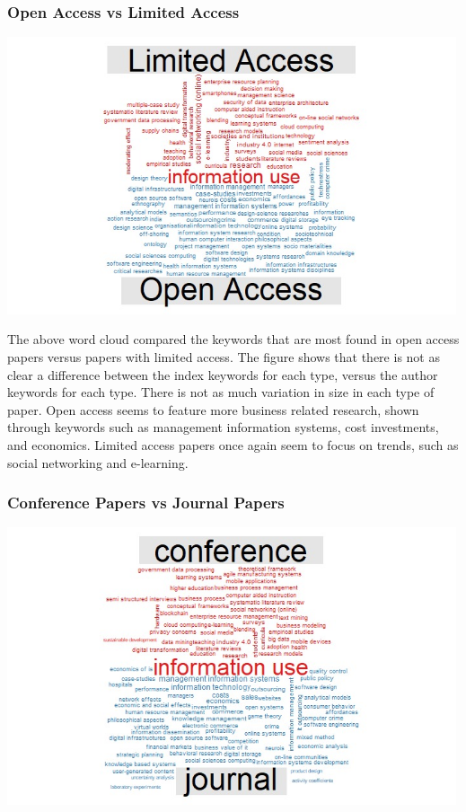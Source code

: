\documentclass[
  letterpaper,
  DIV=11,
  numbers=noendperiod]{scrartcl}
\begin{document}
\hypertarget{open-access-vs-limited-access-1}{%
\subsubsection{Open Access vs Limited
Access}\label{open-access-vs-limited-access-1}}

\includegraphics[width=5.20833in,height=\textheight]{images/indexLimitedvsOpen.jpg}

The above word cloud compared the keywords that are most found in open
access papers versus papers with limited access. The figure shows that
there is not as clear a difference between the index keywords for each
type, versus the author keywords for each type. There is not as much
variation in size in each type of paper. Open access seems to feature
more business related research, shown through keywords such as
management information systems, cost investments, and economics. Limited
access papers once again seem to focus on trends, such as social
networking and e-learning.

\hypertarget{conference-papers-vs-journal-papers-1}{%
\subsubsection{Conference Papers vs Journal
Papers}\label{conference-papers-vs-journal-papers-1}}

\includegraphics[width=5.20833in,height=\textheight]{images/indexConferencevsJournal.jpg}
\end{document}
